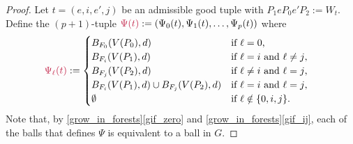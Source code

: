 \documentclass{patmorin}
\DeclareMathOperator{\thick}{th}
\begin{document}
\begin{proof}





Let $t=(e,i,e',j)$ be an admissible good tuple with $P_1eP_0e'P_2:=W_t$.
Define the $(p+1)$-tuple $\mathdefin{\Psi(t)}:=(\Psi_0(t),\Psi_1(t),\ldots,\Psi_p(t))$ where
\begin{align*}
\mathdefin{\Psi_\ell(t)} &:=\begin{cases}
B_{F_0}(V(P_0),d)&\textrm{if $\ell=0$,}\\
B_{F_i}(V(P_1),d)&\textrm{if $\ell=i$ and $\ell\neq j$,}\\
B_{F_j}(V(P_2),d)&\textrm{if $\ell\neq i$ and $\ell= j$,}\\
B_{F_i}(V(P_1),d)\cup B_{F_j}(V(P_2),d)&\textrm{if $\ell= i$ and $\ell= j$,}\\
\emptyset&\textrm{if $\ell\notin\{0,i,j\}$.}
\end{cases}
\end{align*}
Note that, by \cref{grow_in_forests}\cref{gif_zero} and \cref{grow_in_forests}\cref{gif_ij}, each of the balls that defines $\Psi$ is equivalent to a ball in $G$.


\end{proof}
\end{document}
